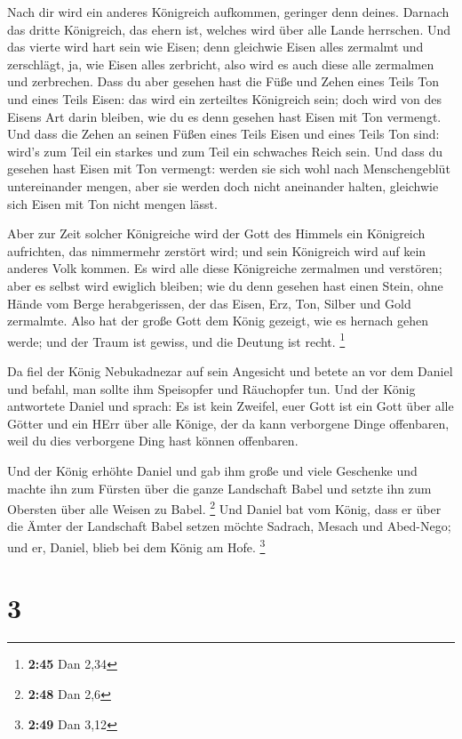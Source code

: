  Nach dir wird ein anderes Königreich aufkommen, geringer
denn deines. Darnach das dritte Königreich, das ehern ist, welches wird
über alle Lande herrschen.  Und das vierte wird hart sein
wie Eisen; denn gleichwie Eisen alles zermalmt und zerschlägt, ja, wie
Eisen alles zerbricht, also wird es auch diese alle zermalmen und
zerbrechen.  Dass du aber gesehen hast die Füße und Zehen
eines Teils Ton und eines Teils Eisen: das wird ein zerteiltes
Königreich sein; doch wird von des Eisens Art darin bleiben, wie du es
denn gesehen hast Eisen mit Ton vermengt.  Und dass die
Zehen an seinen Füßen eines Teils Eisen und eines Teils Ton sind: wird's
zum Teil ein starkes und zum Teil ein schwaches Reich sein.
 Und dass du gesehen hast Eisen mit Ton vermengt: werden
sie sich wohl nach Menschengeblüt untereinander mengen, aber sie werden
doch nicht aneinander halten, gleichwie sich Eisen mit Ton nicht mengen
lässt.

 Aber zur Zeit solcher Königreiche wird der Gott des
Himmels ein Königreich aufrichten, das nimmermehr zerstört wird; und
sein Königreich wird auf kein anderes Volk kommen. Es wird alle diese
Königreiche zermalmen und verstören; aber es selbst wird ewiglich
bleiben;  wie du denn gesehen hast einen Stein, ohne Hände
vom Berge herabgerissen, der das Eisen, Erz, Ton, Silber und Gold
zermalmte. Also hat der große Gott dem König gezeigt, wie es hernach
gehen werde; und der Traum ist gewiss, und die Deutung ist recht.
\footnote{\textbf{2:45} Dan 2,34}

 Da fiel der König Nebukadnezar auf sein Angesicht und
betete an vor dem Daniel und befahl, man sollte ihm Speisopfer und
Räuchopfer tun.  Und der König antwortete Daniel und
sprach: Es ist kein Zweifel, euer Gott ist ein Gott über alle Götter und
ein HErr über alle Könige, der da kann verborgene Dinge offenbaren, weil
du dies verborgene Ding hast können offenbaren.

 Und der König erhöhte Daniel und gab ihm große und viele
Geschenke und machte ihn zum Fürsten über die ganze Landschaft Babel und
setzte ihn zum Obersten über alle Weisen zu Babel. \footnote{\textbf{2:48}
  Dan 2,6}  Und Daniel bat vom König, dass er über die
Ämter der Landschaft Babel setzen möchte Sadrach, Mesach und Abed-Nego;
und er, Daniel, blieb bei dem König am Hofe. \footnote{\textbf{2:49} Dan
  3,12}

\hypertarget{section-2}{%
\section{3}\label{section-2}}

